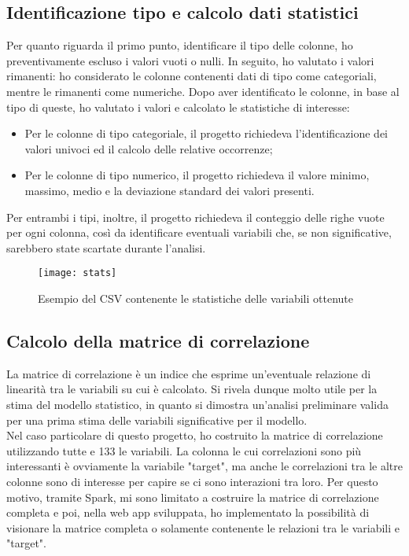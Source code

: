 \newpage
\subsection{Identificazione tipo e calcolo dati statistici}
Per quanto riguarda il primo punto, identificare il tipo delle colonne, ho preventivamente escluso i valori vuoti o nulli.
In seguito, ho valutato i valori rimanenti: ho considerato le colonne contenenti dati di tipo come categoriali, mentre le rimanenti come numeriche. 
Dopo aver identificato le colonne, in base al tipo di queste, ho valutato i valori e calcolato le statistiche di interesse:
\begin{itemize}
	\item Per le colonne di tipo categoriale, il progetto richiedeva l'identificazione dei valori univoci ed il calcolo delle relative occorrenze;
	\item Per le colonne di tipo numerico, il progetto richiedeva il valore minimo, massimo, medio e la deviazione standard dei valori presenti.
\end{itemize}
Per entrambi i tipi, inoltre, il progetto richiedeva il conteggio delle righe vuote per ogni colonna, così da identificare eventuali variabili che, se non significative, sarebbero state scartate durante l'analisi.

\begin{figure}[!h]
	\centering
	\texttt{[image: stats]}
	\caption{Esempio del CSV contenente le statistiche delle variabili ottenute}
\end{figure}

\newpage
\subsection{Calcolo della matrice di correlazione}
La matrice di correlazione è un indice che esprime un'eventuale relazione di linearità tra le variabili su cui è calcolato. Si rivela dunque molto utile per la stima del modello statistico, in quanto si dimostra un'analisi preliminare valida per una prima stima delle variabili significative per il modello.\\
Nel caso particolare di questo progetto, ho costruito la matrice di correlazione utilizzando tutte e 133 le variabili. La colonna le cui correlazioni sono più interessanti è ovviamente la variabile "target", ma anche le correlazioni tra le altre colonne sono di interesse per capire se ci sono interazioni tra loro. Per questo motivo, tramite Spark, mi sono limitato a costruire la matrice di correlazione completa e poi, nella \gls{web app} sviluppata, ho implementato la possibilità di visionare la matrice completa o solamente contenente le relazioni tra le variabili e "target".

